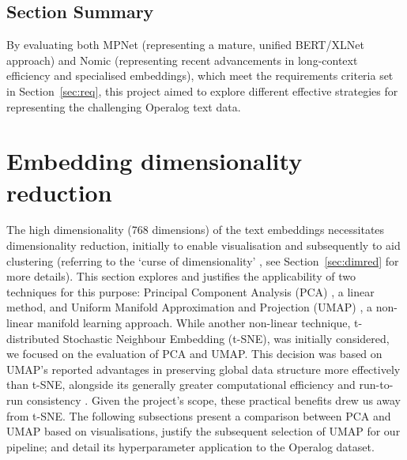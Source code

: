 \documentclass[10pt,oneside]{report}
\begin{document}
\subsection {Section Summary}

By evaluating both MPNet (representing a mature, unified BERT/XLNet approach) and Nomic (representing recent advancements in long-context efficiency and specialised embeddings), which meet the requirements criteria set in Section~\ref{sec:req}, this project aimed to explore different effective strategies for representing the challenging Operalog text data. 

\section{Embedding dimensionality reduction}


The high dimensionality (768 dimensions) of the text embeddings necessitates dimensionality reduction, initially to enable visualisation and subsequently to aid clustering (referring to the `curse of dimensionality' \cite{verleysen2005curse}, see Section~\ref{sec:dimred} for more details). This section explores and justifies the applicability of two techniques for this purpose: Principal Component Analysis (PCA) \cite{pearson1901liii, hotelling1933analysis}, a linear method, and Uniform Manifold Approximation and Projection (UMAP) \cite{mcinnes2018umap}, a non-linear manifold learning approach. While another non-linear technique, t-distributed Stochastic Neighbour Embedding (t-SNE), was initially considered, we focused on the evaluation of PCA and UMAP. This decision was based on UMAP's reported advantages in preserving global data structure more effectively than t-SNE, alongside its generally greater computational efficiency and run-to-run consistency \cite{mcinnes2018umap}. Given the project's scope, these practical benefits drew us away from t-SNE. The following subsections present a comparison between PCA and UMAP based on visualisations, justify the subsequent selection of UMAP for our pipeline; and detail its hyperparameter application to the Operalog dataset.
\end{document}
